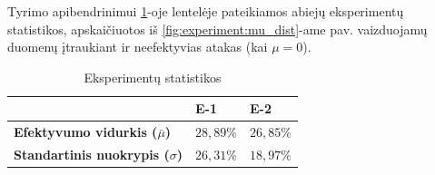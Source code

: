 Tyrimo apibendrinimui \ref{tab:experiment:stats}-oje lentelėje pateikiamos
abiejų eksperimentų statistikos, apskaičiuotos iš
\ref{fig:experiment:mu_dist}-ame pav. vaizduojamų duomenų įtraukiant ir
neefektyvias atakas (kai $\mu = 0$).

\begin{table}[h]
    \centering
    \begin{tabular}{l|l|l}
                                                   & \textbf{E-1} & \textbf{E-2} \\
        \midrule
        \textbf{Efektyvumo vidurkis ($\bar{\mu}$)} & $28,89\%$    & $26,85\%$    \\
        \textbf{Standartinis nuokrypis ($\sigma$)} & $26,31\%$    & $18,97\%$    \\
    \end{tabular}
    \caption{Eksperimentų statistikos}\label{tab:experiment:stats}
\end{table}
